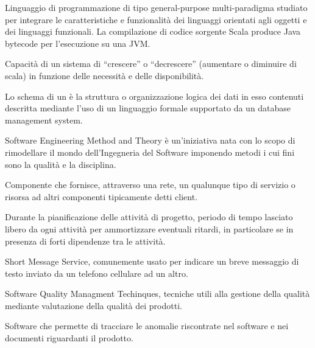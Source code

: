 \begin{itemize}


Linguaggio di programmazione di tipo general-purpose multi-paradigma studiato per integrare le caratteristiche e funzionalità dei linguaggi orientati agli oggetti e dei linguaggi funzionali. La compilazione di codice sorgente Scala produce Java bytecode per l'esecuzione su una JVM.


Capacità di un sistema di ``crescere'' o ``decrescere'' (aumentare o diminuire di scala) in funzione delle necessità e delle disponibilità.


Lo schema di un  è la struttura o organizzazione logica dei dati in esso contenuti descritta mediante l'uso di un linguaggio formale supportato da un database management system.


Software Engineering Method and Theory è un'iniziativa nata con lo scopo di rimodellare il mondo dell'Ingegneria del Software imponendo metodi i cui fini sono la qualità e la disciplina.


Componente che fornisce, attraverso una rete, un qualunque tipo di servizio o risorsa ad altri componenti tipicamente detti client.


Durante la pianificazione delle attività di progetto, periodo di tempo lasciato libero da ogni attività per ammortizzare eventuali ritardi, in particolare se in presenza di forti dipendenze tra le attività.


Short Message Service, comunemente usato per indicare un breve messaggio di testo inviato da un telefono cellulare ad un altro.


Software Quality Managment Techinques, tecniche utili alla gestione della qualità mediante valutazione della qualità dei prodotti.


Software che permette di tracciare le anomalie riscontrate nel software e nei documenti riguardanti il prodotto.



\end{itemize}
